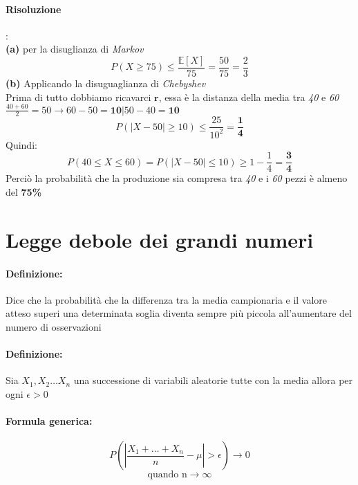 \documentclass[]{article}
\newcommand{\ev}{\mathbb{E}[X]}
\renewcommand{\ev}[1]{\mathbb{E}[#1]}
\newcommand{\definizione}{\paragraph{Definizione:}}
\newcommand{\formula}{\paragraph{Formula generica:}}
\begin{document}
    \paragraph{Risoluzione}: \\
    \textbf{(a)} per la disuglianza di \textit{Markov}
    \[ P(X \geq 75) \leq \frac{\ev{X}}{75} = \frac{50}{75} = \frac{2}{3}\]
    \textbf{(b)} Applicando la disuguaglianza di \textit{Chebyshev} \\ 
    Prima di tutto dobbiamo ricavarci $\boldsymbol{r}$, essa è la distanza della media tra \textit{40} e \textit{60} \\
    $\frac{40+60}{2} = 50 \longrightarrow 60 - 50 = \boldsymbol{10} \rvert 50 - 40 = \boldsymbol{10}$
    \[ P(|X - 50| \geq 10) \leq \frac{25}{10^2} = \boldsymbol{\frac{1}{4}} \]
    Quindi:
    \[ P(40 \leq X \leq 60) = P(|X - 50| \leq 10) \geq 1 - \frac{1}{4} = \boldsymbol{\frac{3}{4}} \]
    Perciò la probabilità che la produzione sia compresa tra \textit{40} e i \textit{60} pezzi è almeno del \textbf{75\%}
    \newpage
    \section{Legge debole dei grandi numeri}
    \definizione Dice che la probabilità che la differenza tra la media campionaria e il valore atteso superi una determinata soglia diventa sempre più piccola all'aumentare del numero di osservazioni
    \definizione Sia $X_1, X_2 \ldots X_n$ una successione di variabili aleatorie tutte con la media \boldsymbol{$\ev{X_i} =: \mu$} allora per ogni $\epsilon > 0$ 
    \formula
    \[ P(|\frac{X_1 + \ldots + X_n}{n} - \mu | > \epsilon) \longrightarrow 0 \] 
    \[ \text{quando n} \longrightarrow \infty \]
\end{document}
